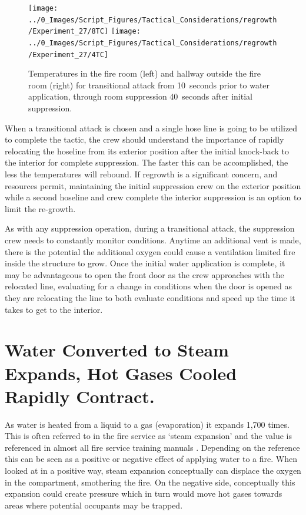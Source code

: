 \documentclass[12pt,oneside]{book}
\begin{document}
\begin{figure}[H]
\centering
\texttt{[image: ../0\_Images/Script\_Figures/Tactical\_Considerations/regrowth/Experiment\_27/8TC]}
\texttt{[image: ../0\_Images/Script\_Figures/Tactical\_Considerations/regrowth/Experiment\_27/4TC]}
\caption[Exterior Suppression Regrowth Temperatures]{Temperatures in the fire room (left) and hallway outside the fire room (right) for transitional attack from 10~seconds prior to water application, through room suppression 40~seconds after initial suppression.}
\label{fig:regrowth_TC_temps}
\end{figure}

When a transitional attack is chosen and a single hose line is going to be utilized to complete the tactic, the crew should understand the importance of rapidly relocating the hoseline from its exterior position after the initial knock-back to the interior for complete suppression. The faster this can be accomplished, the less the temperatures will rebound. If regrowth is a significant concern, and resources permit, maintaining the initial suppression crew on the exterior position while a second hoseline and crew complete the interior suppression is an option to limit the re-growth. 

As with any suppression operation, during a transitional attack, the suppression crew needs to constantly monitor conditions. Anytime an additional vent is made, there is the potential the additional oxygen could cause a ventilation limited fire inside the structure to grow. Once the initial water application is complete, it may be advantageous to open the front door as the crew approaches with the relocated line, evaluating for a change in conditions when the door is opened as they are relocating the line to both evaluate conditions and speed up the time it takes to get to the interior. 

\section{Water Converted to Steam Expands, Hot Gases Cooled Rapidly Contract.} \label{tc:steam_expansion}
As water is heated from a liquid to a gas (evaporation) it expands 1,700 times. This is often referred to in the fire service as `steam expansion' and the value is referenced in almost all fire service training manuals \cite{Corbett_FE_FFI_FFII} \cite{Stowell_Essentials6}. Depending on the reference this can be seen as a positive or negative effect of applying water to a fire. When looked at in a positive way, steam expansion conceptually can displace the oxygen in the compartment, smothering the fire. On the negative side, conceptually this expansion could create pressure which in turn would move hot gases towards areas where potential occupants may be trapped. 
\end{document}

